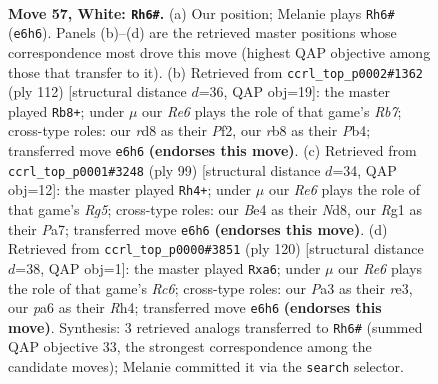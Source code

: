 \documentclass[11pt]{article}
\begin{document}
\clearpage

\begin{figure}[p]\centering
\begin{subfigure}{0.46\textwidth}\centering
\resizebox{\linewidth}{!}{%
\newchessgame
\chessboard[
  setfen={1r1r3k/8/pp2R3/8/bP2B3/P6K/8/6R1 w - - 16 57},
  showmover=false,
  pgfstyle=straightmove, color=movearrow, markmove={e6-h6}
]}
\caption{}
\end{subfigure}\hfill
\begin{subfigure}{0.46\textwidth}\centering
\resizebox{\linewidth}{!}{%
\newchessgame
\chessboard[
  setfen={6k1/1R6/3p3p/1p1rr2P/1P3R2/8/2K2P2/8 w - - 22 57},
  showmover=false,
  pgfstyle=straightmove, color=movearrow, markmove={b7-b8}
]}
\caption{}
\end{subfigure}
\\[4pt]
\begin{subfigure}{0.46\textwidth}\centering
\resizebox{\linewidth}{!}{%
\newchessgame
\chessboard[
  setfen={3nr3/pp4p1/8/3P3p/P5r1/8/R4R1K/2k5 b - - 13 50},
  showmover=false,
  pgfstyle=straightmove, color=movearrow, markmove={g4-h4}
]}
\caption{}
\end{subfigure}\hfill
\begin{subfigure}{0.46\textwidth}\centering
\resizebox{\linewidth}{!}{%
\newchessgame
\chessboard[
  setfen={6k1/5p2/p1R2P2/8/1P5R/4r3/4r3/3K4 w - - 11 61},
  showmover=false,
  pgfstyle=straightmove, color=movearrow, markmove={c6-a6}
]}
\caption{}
\end{subfigure}
\caption{\textbf{Move 57, White: \texttt{Rh6\#}.} (a) Our position; Melanie plays \texttt{Rh6\#} (\texttt{e6h6}). Panels (b)--(d) are the retrieved master positions whose correspondence most drove this move (highest QAP objective among those that transfer to it). (b) Retrieved from \texttt{ccrl\_top\_p0002\#1362} (ply 112) [structural distance $d$=36, QAP obj=19]: the master played \texttt{Rb8+}; under $\mu$ our \emph{Re6} plays the role of that game's \emph{Rb7}; cross-type roles: our \emph{r}d8 as their \emph{P}f2, our \emph{r}b8 as their \emph{P}b4; transferred move \texttt{e6h6} \textbf{(endorses this move)}. (c) Retrieved from \texttt{ccrl\_top\_p0001\#3248} (ply 99) [structural distance $d$=34, QAP obj=12]: the master played \texttt{Rh4+}; under $\mu$ our \emph{Re6} plays the role of that game's \emph{Rg5}; cross-type roles: our \emph{B}e4 as their \emph{N}d8, our \emph{R}g1 as their \emph{P}a7; transferred move \texttt{e6h6} \textbf{(endorses this move)}. (d) Retrieved from \texttt{ccrl\_top\_p0000\#3851} (ply 120) [structural distance $d$=38, QAP obj=1]: the master played \texttt{Rxa6}; under $\mu$ our \emph{Re6} plays the role of that game's \emph{Rc6}; cross-type roles: our \emph{P}a3 as their \emph{r}e3, our \emph{p}a6 as their \emph{R}h4; transferred move \texttt{e6h6} \textbf{(endorses this move)}. Synthesis: 3 retrieved analogs transferred to \texttt{Rh6\#} (summed QAP objective 33, the strongest correspondence among the candidate moves); Melanie committed it via the \texttt{search} selector.}
\label{fig:thought-m112}
\end{figure}
\end{document}
